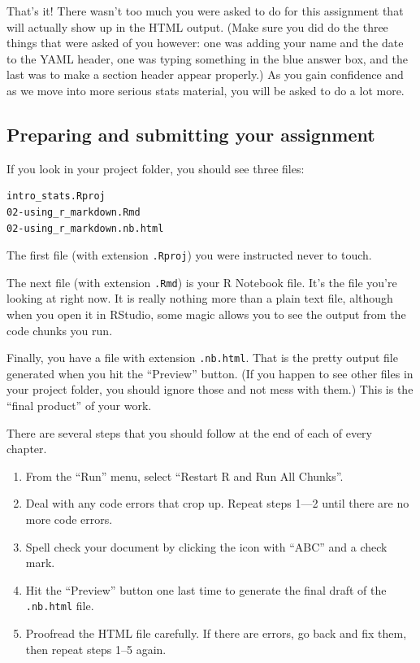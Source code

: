 \documentclass[
]{book}
\providecommand{\tightlist}{%
  \setlength{\itemsep}{0pt}\setlength{\parskip}{0pt}}
\begin{document}
That's it! There wasn't too much you were asked to do for this assignment that will actually show up in the HTML output. (Make sure you did do the three things that were asked of you however: one was adding your name and the date to the YAML header, one was typing something in the blue answer box, and the last was to make a section header appear properly.) As you gain confidence and as we move into more serious stats material, you will be asked to do a lot more.

\hypertarget{rmark-prep}{%
\subsection{Preparing and submitting your assignment}\label{rmark-prep}}

If you look in your project folder, you should see three files:

\begin{verbatim}
intro_stats.Rproj
02-using_r_markdown.Rmd
02-using_r_markdown.nb.html
\end{verbatim}

The first file (with extension \texttt{.Rproj}) you were instructed never to touch.

The next file (with extension \texttt{.Rmd}) is your R Notebook file. It's the file you're looking at right now. It is really nothing more than a plain text file, although when you open it in RStudio, some magic allows you to see the output from the code chunks you run.

Finally, you have a file with extension \texttt{.nb.html}. That is the pretty output file generated when you hit the ``Preview'' button. (If you happen to see other files in your project folder, you should ignore those and not mess with them.) This is the ``final product'' of your work.

There are several steps that you should follow at the end of each of every chapter.

\begin{enumerate}
\def\labelenumi{\arabic{enumi}.}
\tightlist
\item
  From the ``Run'' menu, select ``Restart R and Run All Chunks''.
\item
  Deal with any code errors that crop up. Repeat steps 1---2 until there are no more code errors.
\item
  Spell check your document by clicking the icon with ``ABC'' and a check mark.
\item
  Hit the ``Preview'' button one last time to generate the final draft of the \texttt{.nb.html} file.
\item
  Proofread the HTML file carefully. If there are errors, go back and fix them, then repeat steps 1--5 again.
\end{enumerate}
\end{document}
